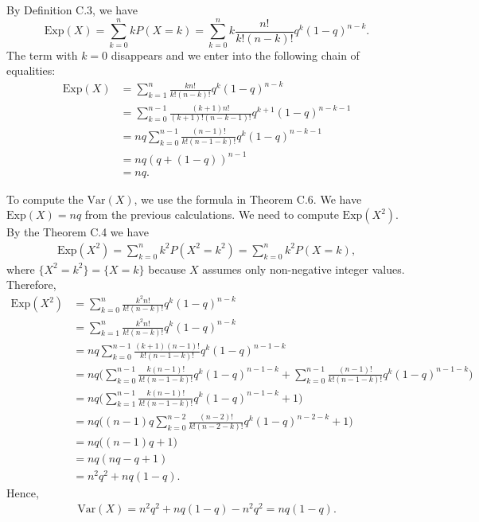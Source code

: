\begin{problem}
By Definition C.3, we have
    \[
        \mathrm{Exp} (X) = \sum_{k = 0}^n k P (X = k) = \sum_{k = 0}^n k \frac{n!}{k! (n - k)!} q^k (1 - q)^{n - k} . 
    \]
The term with $k = 0$ disappears and we enter into the following chain of equalities:
    \begin{align*}
    \mathrm{Exp} (X) &= \sum_{k= 1}^n \frac{k n!}{k! (n - k)!} q^k (1 - q)^{n - k} \\ 
    &= \sum_{k = 0}^{n - 1} \frac{(k + 1) n!}{(k + 1)! (n - k - 1)!} q^{k + 1} (1 - q)^{n - k - 1} \\ 
    &= n q \sum_{k = 0}^{n-1} \frac{(n - 1)!}{k! (n - 1 - k)!} q^k (1 - q)^{n - k - 1} \\ 
    &= nq (q + (1 - q))^{n - 1} \\ 
    &= nq .
    \end{align*} 

To compute the $\mathrm{Var} (X)$, we use the formula in Theorem C.6. We have $\mathrm{Exp} (X) = n q$ from the previous calculations. We need to compute $\mathrm{Exp} (X^2)$. By the Theorem C.4 we have
\begin{align*}
\mathrm{Exp} (X^2) = \sum_{k = 0}^n k^2 P (X^2 = k^2) = \sum_{k = 0}^n k^2 P (X = k) ,
\end{align*} 
where $\{ X^2 = k^2 \} = \{ X = k \}$ because $X$ assumes only non-negative integer values. Therefore,
\begin{align*}
\mathrm{Exp} (X^2) &= \sum_{k = 0}^n \frac{k^2 n!}{k! (n - k)!} q^k (1 - q)^{n - k} \\ 
&= \sum_{k = 1}^n \frac{k^2 n!}{k! (n - k)!} q^k (1 - q)^{n - k} \\ 
&= nq \sum_{k = 0}^{n-1} \frac{(k+1) (n-1)!}{k! (n-1-k)!} q^k (1 - q)^{n-1-k} \\ 
&= nq \Big( \sum_{k = 0}^{n-1} \frac{k (n -1)!}{k! (n - 1-k)!} q^k (1 - q)^{n-1-k} + \sum_{k = 0}^{n-1} \frac{(n-1)!}{k! (n - 1 - k)!} q^k (1 - q)^{n-1-k} \Big) \\ 
&= nq \Big( \sum_{k = 1}^{n-1} \frac{k (n -1)!}{k! (n - 1 - k)!} q^k (1-q)^{n - 1 - k} + 1 \Big) \\ 
&= nq \Big( (n - 1)q \sum_{k = 0}^{n - 2} \frac{(n - 2)!}{k! (n - 2 - k)!} q^k (1 - q)^{n - 2 - k} + 1 \Big) \\ 
&= nq \Big( (n - 1)q + 1 ) \\ 
&= nq (nq - q + 1) \\ 
&= n^2 q^2 + nq (1 - q) .
\end{align*} 
Hence,
\begin{align*}
\mathrm{Var} (X) = n^2 q^2 + nq (1 - q) - n^2 q^2 = nq (1 - q) . \tag*{$\triangle$}
\end{align*} 
\end{problem}

